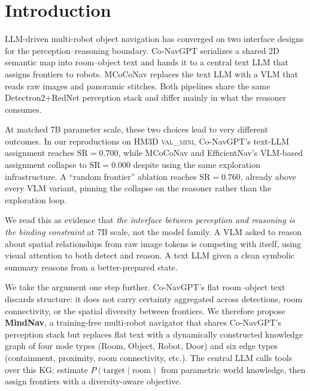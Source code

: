 \section{Introduction}

LLM-driven multi-robot object navigation has converged on two interface
designs for the perception--reasoning boundary. Co-NavGPT \citep{conavgpt}
serializes a shared 2D semantic map into room--object text and hands it to a
central text LLM that assigns frontiers to robots. MCoCoNav \citep{mcoconav}
replaces the text LLM with a VLM that reads raw images and panoramic stitches.
Both pipelines share the same Detectron2+RedNet perception stack and differ
mainly in what the reasoner consumes.

At matched 7B parameter scale, these two choices lead to very different
outcomes. In our reproductions on HM3D \textsc{val\_mini}, Co-NavGPT's text-LLM
assignment reaches $\mathrm{SR}{=}0.700$, while MCoCoNav and EfficientNav's
VLM-based assignment collapse to $\mathrm{SR}{=}0.000$ despite using the same
exploration infrastructure. A ``random frontier'' ablation reaches
$\mathrm{SR}{=}0.760$, already above every VLM variant, pinning the collapse on
the reasoner rather than the exploration loop.

We read this as evidence that \emph{the interface between perception and
reasoning is the binding constraint} at 7B scale, not the model family. A VLM
asked to reason about spatial relationships from raw image tokens is competing
with itself, using visual attention to both detect and reason. A text LLM given
a clean symbolic summary reasons from a better-prepared state.

We take the argument one step further. Co-NavGPT's flat room--object text
discards structure: it does not carry certainty aggregated across detections,
room connectivity, or the spatial diversity between frontiers. We therefore
propose \textbf{MindNav}, a training-free multi-robot navigator that shares
Co-NavGPT's perception stack but replaces flat text with a dynamically
constructed knowledge graph of four node types (Room, Object, Robot, Door)
and six edge types (containment, proximity, room connectivity, etc.). The
central LLM calls tools over this KG: estimate $P(\text{target}\mid\text{room})$
from parametric world knowledge, then assign frontiers with a diversity-aware
objective.

